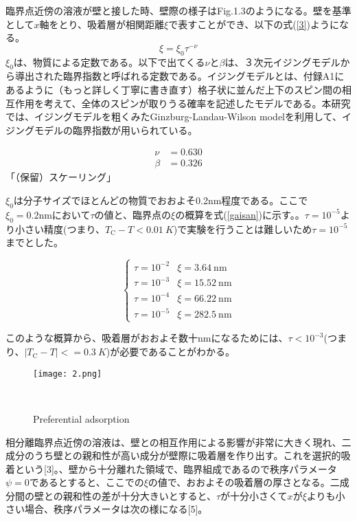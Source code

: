 \documentclass[a4paper,12pt, oneside, openany]{jsbook}
\begin{document}
\newpage
臨界点近傍の溶液が壁と接した時、壁際の様子はFig.1.3のようになる。壁を基準として$x$軸をとり、吸着層が相関距離$\xi$で表すことができ、以下の式(\ref{3})ようになる。
\begin{equation}\label{3}
\xi=\xi_0\tau^{-\nu}
\end{equation}
$\xi_0$は、物質による定数である。以下で出てくる$\nu$と$\beta$は、３次元イジングモデルから導出された臨界指数と呼ばれる定数である。イジングモデルとは、付録A1にあるように（もっと詳しく丁寧に書き直す）格子状に並んだ上下のスピン間の相互作用を考えて、全体のスピンが取りうる確率を記述したモデルである。本研究では、イジングモデルを粗くみたGinzburg-Landau-Wilson modelを利用して、イジングモデルの臨界指数が用いられている。

\begin{equation}
\begin{split}
   \nu & = 0.630\\
  \beta & = 0.326
\end{split}
\end{equation}
\noindent
「（保留）スケーリング」

$\xi_0$は分子サイズでほとんどの物質でおおよそ0.2nm程度である。ここで$\xi_0=0.2\mathrm{nm}$において$\tau$の値と、臨界点の$\xi$の概算を式(\ref{gaisan})に示す。。$\tau=10^{-5}$より小さい精度(つまり、$T_{\mathrm{C}}-T<0.01\ K$)で実験を行うことは難しいため$\tau=10^{-5}$までとした。

\begin{equation}\label{gaisan}
   \begin{cases}
  \tau=10^{-2} & \xi=3.64\ \mathrm{nm}\\
  \tau=10^{-3} & \xi=15.52\  \mathrm{nm}\\
  \tau=10^{-4} & \xi=66.22\  \mathrm{nm}\\
  \tau=10^{-5} & \xi=282.5 \ \mathrm{nm}
  \end{cases}
\end{equation}

\noindent このような概算から、吸着層がおおよそ数十nmになるためには、$\tau<10^{-3}$(つまり、$|T_\mathrm{C}-T|<=0.3\ K$)が必要であることがわかる。
\newpage

\begin{figure}[!htbp]
\label{Fig.4}
\texttt{[image: 2.png]}
\vspace*{-0.4cm}
\centering  %
\begin{spacing}{0.8}　%
\caption{Preferential adsorption}
\end{spacing}
\end{figure}
\noindent
相分離臨界点近傍の溶液は、壁との相互作用による影響が非常に大きく現れ、二成分のうち壁との親和性が高い成分が壁際に吸着層を作り出す。これを選択的吸着という[3]。、壁から十分離れた領域で、臨界組成であるので秩序パラメータ$\psi=0$であるとすると、ここでの$\xi$の値で、おおよその吸着層の厚さとなる。二成分間の壁との親和性の差が十分大きいとすると、$\tau$が十分小さくて$x$が$\xi$よりも小さい場合、秩序パラメータは次の様になる[5]。
\end{document}
